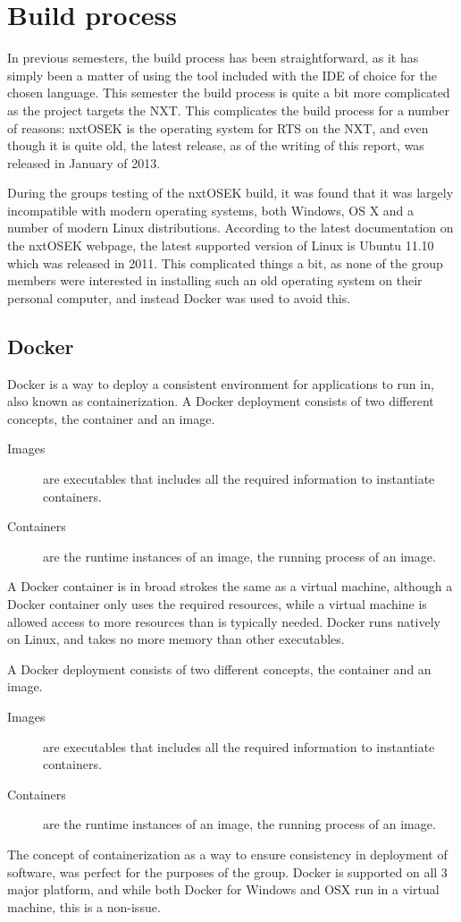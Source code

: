 \section{Build process}\label{sec:buildprocess}
In previous semesters, the build process has been straightforward, as it has simply been a matter of using the tool included with the IDE of choice for the chosen language.
This semester the build process is quite a bit more complicated as the project targets the NXT.
This complicates the build process for a number of reasons:
nxtOSEK is the operating system for RTS on the NXT, and even though it is quite old, the latest release, as of the writing of this report, was released in January of 2013\cite{osekrelease}.

During the groups testing of the nxtOSEK build, it was found that it was largely incompatible with modern operating systems, both Windows, OS X and a number of modern Linux distributions.
According to the latest documentation on the nxtOSEK webpage, the latest supported version of Linux is Ubuntu 11.10 which was released in 2011.
This complicated things a bit, as none of the group members were interested in installing such an old operating system on their personal computer, and instead Docker was used to avoid this.

\subsection{Docker}\label{subsec:docker}
Docker is a way to deploy a consistent environment for applications to run in, also known as containerization\cite{dockerdocstart}.
A Docker deployment consists of two different concepts, the container and an image.
\begin{description}
    \item [Images] are executables that includes all the required information to instantiate containers.
    \item[Containers] are the runtime instances of an image, the running process of an image.
\end{description}

A Docker container is in broad strokes the same as a virtual machine, although a Docker container only uses the required resources, while a virtual machine is allowed access to more resources than is typically needed.
Docker runs natively on Linux, and takes no more memory than other executables.

A Docker deployment consists of two different concepts, the container and an image.
\begin{description}
    \item[Images] are executables that includes all the required information to instantiate containers.
    \item[Containers] are the runtime instances of an image, the running process of an image.
\end{description}
The concept of containerization as a way to ensure consistency in deployment of software, was perfect for the purposes of the group.
Docker is supported on all 3 major platform, and while both Docker for Windows and OSX run in a virtual machine, this is a non-issue.

